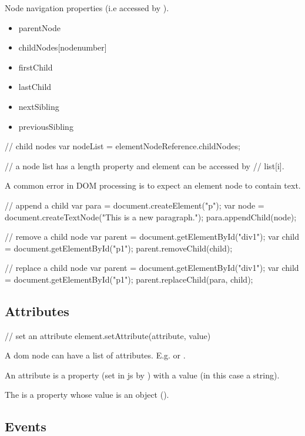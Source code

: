 Node navigation properties (i.e accessed by ).
\begin{itemize}
\item
  parentNode
\item
  childNodes[nodenumber]
\item
  firstChild
\item
  lastChild
\item
  nextSibling
\item
  previousSibling
\end{itemize}

\begin{js}
  // child nodes
  var nodeList = elementNodeReference.childNodes;

  // a node list has a length property and element can be accessed by
  // list[i].
\end{js}

A common error in DOM processing is to expect an element node to contain text.

\begin{js}
  // append a child
  var para = document.createElement("p");
  var node = document.createTextNode("This is a new paragraph.");
  para.appendChild(node);

  // remove a child node
  var parent = document.getElementById("div1");
  var child = document.getElementById("p1");
  parent.removeChild(child);

  // replace a child node
  var parent = document.getElementById("div1");
  var child = document.getElementById("p1");
  parent.replaceChild(para, child);
\end{js}

\subsection{Attributes}


\begin{js}
  // set an attribute
  element.setAttribute(attribute, value)
\end{js}

A dom node can have a list of attributes. E.g.  or .

An attribute is a property (set in js by ) with
a value (in this case a string).

The  is a property whose value is an object
().


\vskip 3mm
\subsection{Events}


